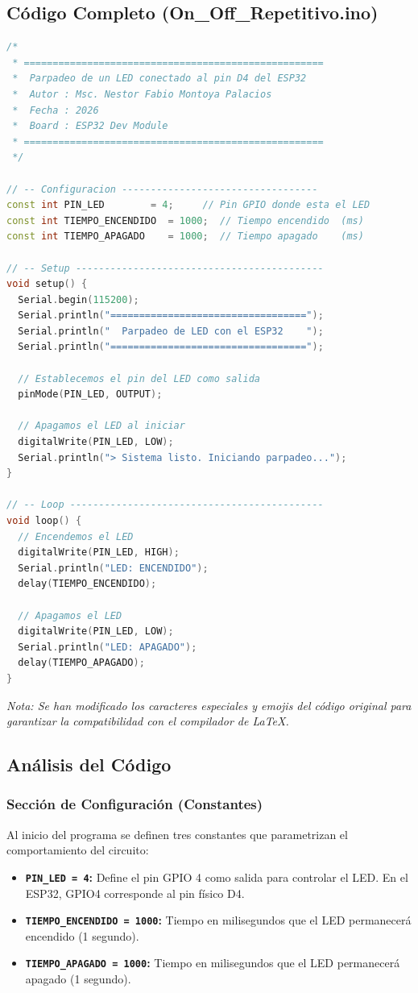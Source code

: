 \documentclass[12pt,a4paper]{article}
\begin{document}
\subsection{Código Completo (On\_Off\_Repetitivo.ino)}
\begin{lstlisting}[language=C++, title=On\_Off\_Repetitivo.ino]
/*
 * ====================================================
 *  Parpadeo de un LED conectado al pin D4 del ESP32
 *  Autor : Msc. Nestor Fabio Montoya Palacios
 *  Fecha : 2026
 *  Board : ESP32 Dev Module
 * ====================================================
 */

// -- Configuracion ----------------------------------
const int PIN_LED        = 4;     // Pin GPIO donde esta el LED
const int TIEMPO_ENCENDIDO  = 1000;  // Tiempo encendido  (ms)
const int TIEMPO_APAGADO    = 1000;  // Tiempo apagado    (ms)

// -- Setup -------------------------------------------
void setup() {
  Serial.begin(115200);
  Serial.println("==================================");
  Serial.println("  Parpadeo de LED con el ESP32    ");
  Serial.println("==================================");

  // Establecemos el pin del LED como salida
  pinMode(PIN_LED, OUTPUT);

  // Apagamos el LED al iniciar
  digitalWrite(PIN_LED, LOW);
  Serial.println("> Sistema listo. Iniciando parpadeo...");
}

// -- Loop --------------------------------------------
void loop() {
  // Encendemos el LED
  digitalWrite(PIN_LED, HIGH);
  Serial.println("LED: ENCENDIDO");
  delay(TIEMPO_ENCENDIDO);

  // Apagamos el LED
  digitalWrite(PIN_LED, LOW);
  Serial.println("LED: APAGADO");
  delay(TIEMPO_APAGADO);
}
\end{lstlisting}
\textit{Nota: Se han modificado los caracteres especiales y emojis del código original para garantizar la compatibilidad con el compilador de \LaTeX.}

\subsection{Análisis del Código}

\subsubsection*{Sección de Configuración (Constantes)}
Al inicio del programa se definen tres constantes que parametrizan el comportamiento del circuito:
\begin{itemize}
    \item \textbf{\texttt{PIN\_LED = 4}:} Define el pin GPIO 4 como salida para controlar el LED. En el ESP32, GPIO4 corresponde al pin físico D4.
    \item \textbf{\texttt{TIEMPO\_ENCENDIDO = 1000}:} Tiempo en milisegundos que el LED permanecerá encendido (1 segundo).
    \item \textbf{\texttt{TIEMPO\_APAGADO = 1000}:} Tiempo en milisegundos que el LED permanecerá apagado (1 segundo).
\end{itemize}
\end{document}
